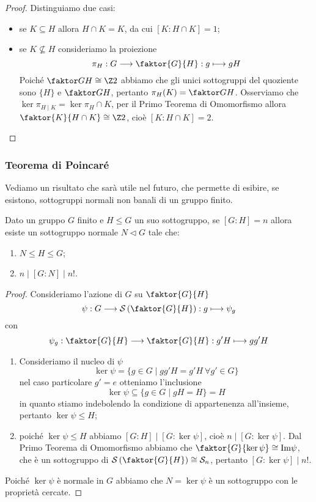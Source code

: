 \documentclass[11pt]{scrartcl}
\begin{document}
	\begin{proof}
		Distinguiamo due casi:
		\begin{itemize}
			\item se $K \subseteq H$ allora $H \cap K = K$, da cui $[K:H\cap K] = 1$;
			\item se $K \nsubseteq H$ consideriamo la proiezione 
			\[
			\pi_H: G\longrightarrow \faktor{G}{H} :g \longmapsto gH
			\]
			Poiché $\faktor G H \cong \Z2$ abbiamo che gli unici sottogruppi 
			del quoziente sono $\{H\}$ e $\faktor G H$, pertanto 
			$\pi_H(K) = \faktor G H$. Osserviamo che $\ker\pi_{H\mid K}
			= \ker \pi_H \cap K$, per il Primo Teorema di Omomorfismo allora 
			$\faktor{K}{H\cap K} \cong \Z2$, cioè $[K:H\cap K] = 2$.
		\end{itemize}
	\end{proof}
	
	\subsubsection{Teorema di Poincaré}
	
	Vediamo un risultato che sarà utile nel futuro, che permette di esibire,
	se esistono, sottogruppi normali non banali di un gruppo finito.
	
	\begin{theorem}
		\label{teorema1.50}
		Dato un gruppo $G$ finito e $H\leqslant G$ un suo sottogruppo, 
		se $[G:H] = n$ allora esiste un sottogruppo normale $N\triangleleft G$ 
		tale che:
		\begin{enumerate}[(1)]
			\item $N\leqslant H \leqslant G$;
			\item $n \mid [G:N] \mid n!$.
		\end{enumerate}
	\end{theorem}
	
	\begin{proof}
		Consideriamo l'azione di $G$ su $\faktor{G}{H}$
		\[
		\psi: G\longrightarrow\mathcal{S}\left(\faktor{G}{H}\right):g\longmapsto \psi_g
		\]
		con
		\[
		\psi_g:\faktor{G}{H}\longrightarrow\faktor{G}{H} : g'H\longmapsto gg'H
		\]
		\begin{enumerate}[(1)]
			\item Consideriamo il nucleo di $\psi$
			\[
			\ker\psi = \{g \in G\mid gg'H = g'H~\forall g' \in G\}
			\]
			nel caso particolare $g' = e$ otteniamo l'inclusione
			\[
			\ker\psi \subseteq \{g \in G \mid gH = H\} = H
			\]
			in quanto stiamo indebolendo la condizione di appartenenza all'insieme,
			pertanto $\ker\psi \leqslant H$;
			\item poiché $\ker\psi \leqslant H$ abbiamo $[G:H]\mid [G:\ker\psi]$, cioè
			$n \mid [G:\ker\psi]$. Dal Primo Teorema di Omomorfismo abbiamo che
			$\faktor{G}{\ker\psi} \cong \mathrm{Im\psi}$, che è un sottogruppo
			di $\mathcal{S}\left(\faktor{G}{H}\right)\cong \mathcal{S}_n$, pertanto $[G:\ker\psi]\mid n!$.
		\end{enumerate}
		Poiché $\ker\psi$ è normale in $G$ abbiamo che $N = \ker\psi$ è un sottogruppo
		con le proprietà cercate.
	\end{proof}
	
\end{document}
